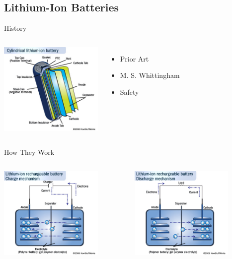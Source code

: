 \documentclass{beamer}
\begin{document}
\subsection{Lithium-Ion Batteries}

\begin{frame}{History}
  \begin{columns}
    \column{5cm}
      \includegraphics[width=5cm]{lionSummary.jpg}
    \column{5cm}
      \begin{itemize}
      \item Prior Art
      \item M. S. Whittingham
      \item Safety
      \end{itemize}
  \end{columns}
\end{frame}

\begin{frame}{How They Work}
  \begin{columns}
    \begin{column}{5cm}
      \includegraphics[width=5cm]{lionCharge.jpg}
    \end{column}
    \begin{column}{5cm}
      \includegraphics[width=5cm]{lionDischarge.jpg}
    \end{column}
  \end{columns}
\end{frame}
\end{document}
